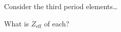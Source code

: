 \documentclass[notes=only]{beamer}
\begin{document}
\begin{frame}{Consider the third period elements\ldots}
	\begin{center}
		
	\end{center}

	What is $Z_\text{eff}$ of each?


%
%
%
%
%
%

\end{frame}
\end{document}

